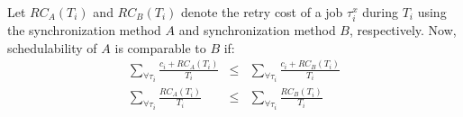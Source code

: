 \documentclass[conference]{IEEEtran}
\newtheorem{clm}{Claim}
\begin{document}
Let $RC_{A}(T_{i})$ and $RC_{B}(T_{i})$ denote the retry cost of a job $\tau_{i}^{x}$ during $T_{i}$ using the synchronization method $A$ and synchronization
method $B$, respectively. Now, schedulability of $A$ is comparable to $B$ if:
\begin{eqnarray}
\sum_{\forall\tau_{i}}\frac{c_{i}+RC_{A}(T_{i})}{T_{i}} & \le & \sum_{\forall\tau_{i}}\frac{c_{i}+RC_{B}(T_{i})}{T_{i}}\nonumber \\
\sum_{\forall\tau_{i}}\frac{RC_{A}(T_{i})}{T_{i}} & \le & \sum_{\forall\tau_{i}}\frac{RC_{B}(T_{i})}{T_{i}}\label{eq:utilization comparison}
\end{eqnarray}
%
\begin{comment}
\subsection{FBLT vs. ECM}

\begin{clm}\label{clm:fblt_ecm}
The schedulability of FBLT is equal to or better than ECM's when the maximum abort number of any preemptive transaction $s_i^k$ is less than or equal to the number of transactions directly conflicting with $s_i^k$ in all other jobs with higher priority than $\tau_{i}$'s current job. 
\end{clm}
\end{comment}
%
\end{document}
